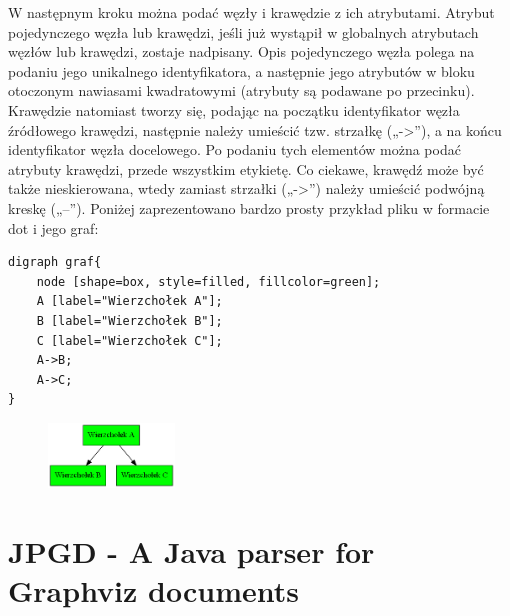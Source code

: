 W następnym kroku można podać węzły i krawędzie z ich atrybutami. Atrybut pojedynczego węzła lub krawędzi, jeśli już wystąpił w globalnych atrybutach węzłów lub krawędzi, zostaje nadpisany. Opis pojedynczego węzła polega na podaniu jego unikalnego identyfikatora, a następnie jego atrybutów w bloku otoczonym nawiasami kwadratowymi (atrybuty są podawane po przecinku).  Krawędzie natomiast tworzy się, podając na początku identyfikator węzła źródłowego krawędzi, następnie należy umieścić tzw. strzałkę („->”), a na końcu identyfikator węzła docelowego. Po podaniu tych elementów można podać atrybuty krawędzi, przede wszystkim etykietę. Co ciekawe, krawędź może być także nieskierowana, wtedy zamiast strzałki („->”) należy umieścić podwójną kreskę („--”). 
Poniżej zaprezentowano bardzo prosty przykład pliku w formacie dot i jego graf:
\begin{verbatim}
digraph graf{
    node [shape=box, style=filled, fillcolor=green];
    A [label="Wierzchołek A"];
    B [label="Wierzchołek B"];
    C [label="Wierzchołek C"];
    A->B;
    A->C;
}
\end{verbatim}
\begin{figure}[H]
\includegraphics[width=0.3\textwidth]{img/graf.png}
\end{figure}



\section{JPGD - A Java parser for Graphviz documents}

